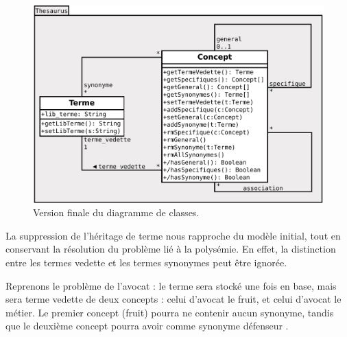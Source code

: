 \begin{figure}[H]
\begin{center}
\includegraphics[width=\textwidth]{files/class_v3}
\end{center}
\caption{Version finale du diagramme de classes.}
\end{figure}

La suppression de l'héritage de terme nous rapproche du modèle initial, tout en conservant la résolution du problème lié à la polysémie. En effet, la distinction entre les termes vedette et les termes synonymes peut être ignorée.

Reprenons le problème de l'\og avocat \fg : le terme sera stocké une fois en base, mais sera terme vedette de deux concepts : celui d'\og avocat \fg le fruit, et celui d'\og avocat \fg le métier. Le premier concept (fruit) pourra ne contenir aucun synonyme, tandis que le deuxième concept pourra avoir comme synonyme \og défenseur \fg{}.
